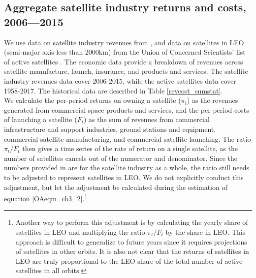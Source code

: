 \documentclass[12pt]{article}
\begin{document}
\subsection{Aggregate satellite industry returns and costs, 2006---2015}

We use data on satellite industry revenues from \citet{wienzierl2018}, and data on satellites in LEO (semi-major axis less than 2000km) from the Union of Concerned Scientists' list of active satellites \citep{UCSdata}. The economic data provide a breakdown of revenues across satellite manufacture, launch, insurance, and products and services. The satellite industry revenues data cover 2006-2015, while the active satellites data cover 1958-2017. The historical data are described in Table \ref{revcost_sumstat}. \\

We calculate the per-period returns on owning a satellite ($\pi_t$) as the revenues generated from commercial space products and services, and the per-period costs of launching a satellite ($F_t$) as the sum of revenues from commercial infrastructure and support industries, ground stations and equipment, commercial satellite manufacturing, and commercial satellite launching. The ratio $\pi_t/F_t$ then gives a time series of the rate of return on a single satellite, as the number of satellites cancels out of the numerator and denominator. Since the numbers provided in \citet{wienzierl2018} are for the satellite industry as a whole, the ratio still needs to be adjusted to represent satellites in LEO. We do not explicitly conduct this adjustment, but let the adjustment be calculated during the estimation of equation \ref{OAeqm_ch3_2}.\footnote{Another way to perform this adjustment is by calculating the yearly share of satellites in LEO and multiplying the ratio $\pi_t/F_t$ by the share in LEO. This approach is difficult to generalize to future years since it requires projections of satellites in other orbits. It is also not clear that the returns of satellites in LEO are truly proportional to the LEO share of the total number of active satellites in all orbits.} \\ %
\end{document}
